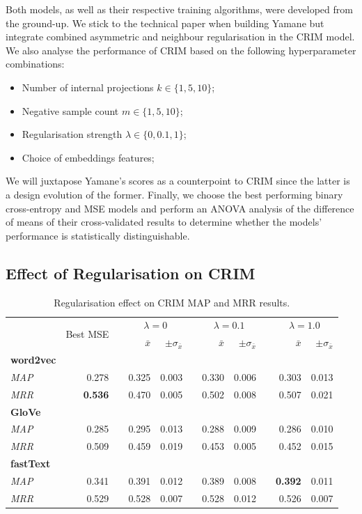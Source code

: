 Both models, as well as their respective training algorithms, were developed from the ground-up.  We stick to the technical paper when building Yamane but integrate combined asymmetric and neighbour regularisation in the CRIM model.  We also analyse the performance of CRIM based on the following hyperparameter combinations:
\begin{itemize}
    \item Number of internal projections $k \in \{1, 5, 10\}$;
    \item Negative sample count $m \in \{1, 5, 10\}$;
    \item Regularisation strength $\lambda \in \{0, 0.1, 1\}$;
    \item Choice of embeddings features;
\end{itemize}
We will juxtapose Yamane's scores as a counterpoint to CRIM since the latter is a design evolution of the former.  Finally, we choose the best performing binary cross-entropy and \ac{MSE} models and perform an \ac{ANOVA} analysis of the difference of means of their cross-validated results to determine whether the models' performance is statistically distinguishable.

\subsection{Effect of Regularisation on CRIM}
\begin{table}\centering
\begin{tabular}{@{}lrcrrcrrcrr@{}}\toprule
& \multirow{2}{*}{Best MSE} & \phantom{a} &  \multicolumn{2}{c}{$\lambda=0$} & \phantom{a} & \multicolumn{2}{c}{$\lambda=0.1$} & \phantom{a} & \multicolumn{2}{c}{$\lambda=1.0$}\\
\cmidrule{4-5} \cmidrule{7-8} \cmidrule{10-11}
&  && $\bar{x}$ & $\pm\sigma_{\bar{x}}$ && $\bar{x}$ & $\pm\sigma_{\bar{x}}$ && $\bar{x}$ & $\pm\sigma_{\bar{x}}$ \\ \midrule
\textbf{word2vec} \\
\textit{MAP} & 0.278 && 0.325 & 0.003 && 0.330 & 0.006 && 0.303 & 0.013 \\
\textit{MRR} & \textbf{0.536} && 0.470 & 0.005 && 0.502 & 0.008 && 0.507 & 0.021 \\
\cmidrule{2-11}
\textbf{GloVe} \\
\textit{MAP} & 0.285 && 0.295 & 0.013 && 0.288 & 0.009 && 0.286 & 0.010 \\
\textit{MRR} & 0.509 && 0.459 & 0.019 && 0.453 & 0.005 && 0.452 & 0.015 \\
\cmidrule(lr){2-11}
\textbf{fastText} \\
\textit{MAP} & 0.341 && 0.391 & 0.012 && 0.389 & 0.008 && \textbf{0.392} & 0.011 \\
\textit{MRR} & 0.529 && 0.528 & 0.007 && 0.528 & 0.012 && 0.526 & 0.007 \\
\bottomrule
\end{tabular}
\caption{Regularisation effect on CRIM \ac{MAP} and \ac{MRR} results.}\label{tab:crim_regularised}
\end{table}


